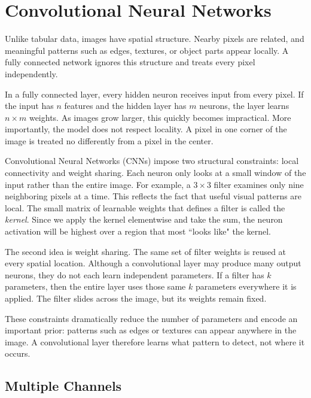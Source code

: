 \section{Convolutional Neural Networks}

\medskip

Unlike tabular data, images have spatial structure. Nearby pixels are related, and meaningful patterns such as edges, textures, or object parts appear locally. A fully connected network ignores this structure and treats every pixel independently.

In a fully connected layer, every hidden neuron receives input from every pixel. If the input has $n$ features and the hidden layer has $m$ neurons, the layer learns $n \times m$ weights. As images grow larger, this quickly becomes impractical. More importantly, the model does not respect locality. A pixel in one corner of the image is treated no differently from a pixel in the center.

Convolutional Neural Networks (CNNs) impose two structural constraints: local connectivity and weight sharing. Each neuron only looks at a small window of the input rather than the entire image. For example, a $3 \times 3$ filter examines only nine neighboring pixels at a time. This reflects the fact that useful visual patterns are local. The small matrix of learnable weights that defines a filter is called the \textit{kernel}. Since we apply the kernel elementwise and take the sum, the neuron activation will be highest over a region that most ``looks like" the kernel. 

The second idea is weight sharing. The same set of filter weights is reused at every spatial location. Although a convolutional layer may produce many output neurons, they do not each learn independent parameters. If a filter has $k$ parameters, then the entire layer uses those same $k$ parameters everywhere it is applied. The filter slides across the image, but its weights remain fixed.

These constraints dramatically reduce the number of parameters and encode an important prior: patterns such as edges or textures can appear anywhere in the image. A convolutional layer therefore learns what pattern to detect, not where it occurs.

\bigskip

\subsection{Multiple Channels}


